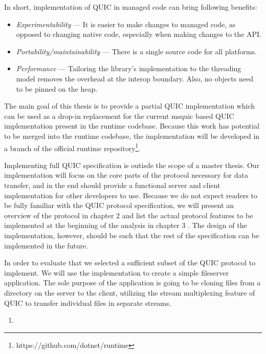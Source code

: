 In short, implementation of QUIC in managed \dotnet{} code can bring following benefits:

\begin{itemize}
  \item \textit{Experimentability} ---
    It is easier to make changes to managed code, as opposed to changing native code, especially
    when making changes to the API\@.

  \item \textit{Portability/maintainability} ---
    There is a single source code for all platforms.

  \item \textit{Performance} ---
    Tailoring the library's implementation to the \dotnet{} threading model removes the overhead at
    the interop boundary. Also, no objects need to be pinned on the heap.
\end{itemize}

The main goal of this thesis is to provide a partial \csharp{} QUIC implementation which can be used
as a drop-in replacement for the current msquic based QUIC implementation present in the \dotnet{}
runtime codebase. Because this work has potential to be merged into the \dotnet{} runtime codebase,
the implementation will be developed in a branch of  the official \dotnet{} runtime
repository\footnote{https://github.com/dotnet/runtime}.

Implementing full QUIC specification is outisde the scope of a master thesis. Our implementation
will focus on the core parts of the protocol necessary for data transfer, and in the end should
provide a functional server and client implementation for other developers to use. Because we do not
expect readers to be fully familiar with the QUIC protocol specification, we will present an
overview of the protocol in chapter 2  and list the actual protocol features to be
implemented at the beginning of the analysis in chapter 3 . The design of the
implementation, however, should be such that the rest of the specification can be implemented in the future.

In order to evaluate that we selected a sufficient subset of the QUIC protocol to implement. We will
use the implementation to create a simple fileserver application. The sole purpose of the
application is going to be cloning files from a directory on the server to the client, utilizing the
stream multiplexing feature of QUIC to transfer individual files in separate streams.


\begin{enumerate}
  \item \textit{}
\end{enumerate}
